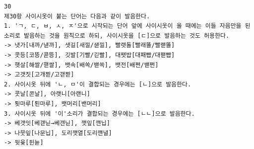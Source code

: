 \documentclass[letterpaper]{article} %
\begin{document}
\begin{verbatim}
30
제30항 사이시옷이 붙는 단어는 다음과 같이 발음한다.
1. 'ㄱ, ㄷ, ㅂ, ㅅ, ㅈ'으로 시작되는 단어 앞에 사이시옷이 올 때에는 이들 자음만을 된소리로 발음하는 것을 원칙으로 하되, 사이시옷을 [ㄷ]으로 발음하는 것도 허용한다.
-> 냇가[내까/낻까], 샛길[새낄/샏낄], 빨랫돌[빨래똘/빨랟똘]
-> 콧등[코뜽/콛뜽], 깃발[기빨/긷빨], 대팻밥[대패빱/대팯빱]
-> 햇살[해쌀/핻쌀], 뱃속[배쏙/밷쏙], 뱃전[배쩐/밷쩐]
-> 고갯짓[고개찓/고갣찓]
2. 사이시옷 뒤에 'ㄴ, ㅁ'이 결합되는 경우에는 [ㄴ]으로 발음한다.
-> 콧날[콘날], 아랫니[아랜니]
-> 툇마루[퇸마루], 뱃머리[밴머리]
3. 사이시옷 뒤에 '이'소리가 결합되는 경우에는 [ㄴㄴ]으로 발음한다.
-> 베갯잇[베갣닏→베갠닏], 깻잎[깬닙]
-> 나뭇잎[나문닙], 도리깻열[도리깬녈]
-> 뒷윷[뒨뉻]

\end{verbatim}


\bigskip

\end{document}
